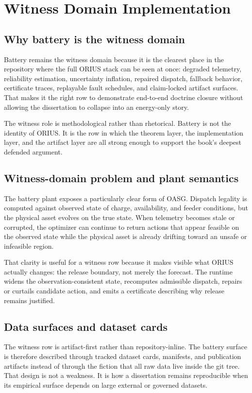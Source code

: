 \chapter{Witness Domain Implementation}
\label{ch:witness-domain-implementation}

\section{Why battery is the witness domain}
Battery remains the witness domain because it is the clearest place in the repository where
the full ORIUS stack can be seen at once: degraded telemetry, reliability estimation,
uncertainty inflation, repaired dispatch, fallback behavior, certificate traces, replayable
fault schedules, and claim-locked artifact surfaces. That makes it the right row to
demonstrate end-to-end doctrine closure without allowing the dissertation to collapse into
an energy-only story.

The witness role is methodological rather than rhetorical. Battery is not the identity of
ORIUS. It is the row in which the theorem layer, the implementation layer, and the artifact
layer are all strong enough to support the book's deepest defended argument.

\section{Witness-domain problem and plant semantics}
The battery plant exposes a particularly clear form of OASG. Dispatch legality is computed
against observed state of charge, availability, and feeder conditions, but the physical
asset evolves on the true state. When telemetry becomes stale or corrupted, the optimizer
can continue to return actions that appear feasible on the observed state while the physical
asset is already drifting toward an unsafe or infeasible region.

That clarity is useful for a witness row because it makes visible what ORIUS actually
changes: the release boundary, not merely the forecast. The runtime widens the
observation-consistent state, recomputes admissible dispatch, repairs or curtails candidate
action, and emits a certificate describing why release remains justified.

\section{Data surfaces and dataset cards}
The witness row is artifact-first rather than repository-inline. The battery surface is
therefore described through tracked dataset cards, manifests, and publication artifacts
instead of through the fiction that all raw data live inside the git tree. That design is
not a weakness. It is how a dissertation remains reproducible when its empirical surface
depends on large external or governed datasets.

